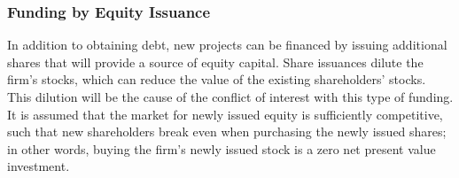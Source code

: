 \documentclass[main.tex]{subfiles}
\begin{document}
    \subsubsection{Funding by Equity Issuance}
        In addition to obtaining debt, new projects can be financed by issuing additional shares
        that will provide a source of equity capital.
        Share issuances dilute the firm's stocks, which can reduce the value of the existing shareholders' stocks.
        This dilution will be the cause of the conflict of interest with this type of funding.
        It is assumed that the market for newly issued equity is sufficiently competitive,
        such that new shareholders break even when purchasing the newly issued shares;
        in other words, buying the firm's newly issued stock is a zero net present value investment.
\end{document}
